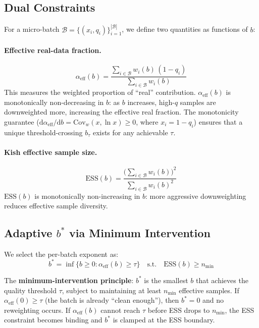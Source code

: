 \documentclass[11pt,a4paper]{article}
\newcommand{\bstar}{b^{*}}
\newcommand{\aeff}{\alpha_{\mathrm{eff}}}
\newcommand{\nmin}{n_{\min}}
\begin{document}
\subsection{Dual Constraints}
\label{sec:dual}

For a micro-batch $\mathcal{B}=\{(x_i,q_i)\}_{i=1}^{|\mathcal{B}|}$, we define two quantities as functions of $b$:

\paragraph{Effective real-data fraction.}
\begin{equation}
\aeff(b) = \frac{\sum_{i\in\mathcal{B}} w_i(b)\,(1-q_i)}{\sum_{i\in\mathcal{B}} w_i(b)}
\label{eq:alpha}
\end{equation}
This measures the weighted proportion of ``real'' contribution.
$\aeff(b)$ is monotonically non-decreasing in $b$: as $b$ increases, high-$q$ samples are downweighted more, increasing the effective real fraction.
The monotonicity guarantee ($\mathrm{d}\aeff/\mathrm{d}b = \mathrm{Cov}_w(x,\ln x)\geq 0$, where $x_i=1-q_i$) ensures that a unique threshold-crossing $b_\tau$ exists for any achievable $\tau$.

\paragraph{Kish effective sample size.}
\begin{equation}
\mathrm{ESS}(b) = \frac{\bigl(\sum_{i\in\mathcal{B}} w_i(b)\bigr)^2}{\sum_{i\in\mathcal{B}} w_i(b)^2}
\label{eq:ess}
\end{equation}
$\mathrm{ESS}(b)$ is monotonically non-increasing in $b$: more aggressive downweighting reduces effective sample diversity.

\subsection{Adaptive $\bstar$ via Minimum Intervention}
\label{sec:bstar}

We select the per-batch exponent as:
\begin{equation}
\bstar = \inf\{b \geq 0 : \aeff(b) \geq \tau\} \quad \text{s.t.} \quad \mathrm{ESS}(b) \geq \nmin
\label{eq:bstar}
\end{equation}

The \textbf{minimum-intervention principle}: $\bstar$ is the smallest $b$ that achieves the quality threshold $\tau$, subject to maintaining at least $\nmin$ effective samples.
If $\aeff(0)\geq\tau$ (the batch is already ``clean enough''), then $\bstar=0$ and no reweighting occurs.
If $\aeff(b)$ cannot reach $\tau$ before ESS drops to $\nmin$, the ESS constraint becomes binding and $\bstar$ is clamped at the ESS boundary.
\end{document}
